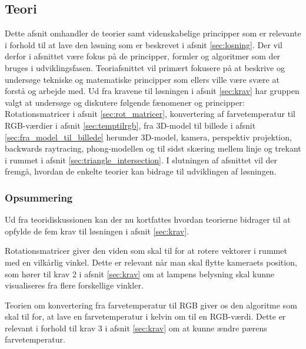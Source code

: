 \subsection{Teori}
\label{sec:teori}

Dette afsnit omhandler de teorier samt videnskabelige principper som er relevante i forhold til at lave den løsning som er beskrevet i afsnit \ref{sec:losning}. Der vil derfor i afsnittet være fokus på de principper, formler og algoritmer som der bruges i udviklingsfasen. Teoriafsnittet vil primært fokusere på at beskrive og undersøge tekniske og matematiske principper som ellers ville være svære at forstå og arbejde med. Ud fra kravene til løsningen i afsnit \ref{sec:krav} har gruppen valgt at undersøge og diskutere følgende fænomener og principper: Rotationsmatricer i afsnit \ref{sec:rot_matricer}, konvertering af farvetemperatur til RGB-værdier i afsnit \ref{sec:temptilrgb}, fra 3D-model til billede i afsnit \ref{sec:fra_model_til_billede} herunder 3D-model, kamera, perspektiv projektion, backwards raytracing, phong-modellen og til sidst skæring mellem linje og trekant i rummet i afsnit \ref{sec:triangle_intersection}. I slutningen af afsnittet vil der fremgå, hvordan de enkelte teorier kan bidrage til udviklingen af løsningen.











\subsubsection*{Opsummering}

Ud fra teoridiskussionen kan der nu kortfattes hvordan teorierne bidrager til at opfylde de fem krav til løsningen i afsnit \ref{sec:krav}. 

Rotationsmatricer giver den viden som skal til for at rotere vektorer i rummet med en vilkårlig vinkel. Dette er relevant når man skal flytte kameraets position, som hører til krav 2 i afsnit \ref{sec:krav} om at lampens belysning skal kunne visualiseres fra flere forskellige vinkler.

Teorien om konvertering fra farvetemperatur til RGB giver os den algoritme som skal til for, at lave en farvetemperatur i kelvin om til en RGB-værdi. Dette er relevant i forhold til krav 3 i afsnit \ref{sec:krav} om at kunne ændre pærens farvetemperatur. 

